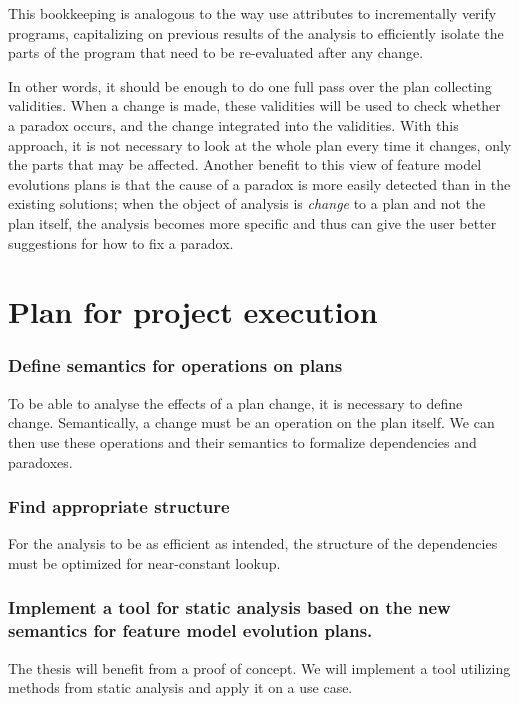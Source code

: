 \documentclass[a4paper,english]{ifimaster}
\begin{document}
This bookkeeping is analogous to the way \citeauthor{article:syntax-driven-program-verification}\parencite{article:syntax-driven-program-verification, art:inc-syntactic-semantic} use attributes to incrementally verify programs, capitalizing on previous results of the analysis to efficiently isolate the parts of the program that need to be re-evaluated after any change. 

In other words, it should be enough to do one full pass over the plan collecting validities. When a change is made, these validities will be used to check whether a paradox occurs, and the change integrated into the validities. With this approach, it is not necessary to look at the whole plan every time it changes, only the parts that may be affected. Another benefit to this view of feature model evolutions plans is that the cause of a paradox is more easily detected than in the existing solutions; when the object of analysis is \emph{change} to a plan and not the plan itself, the analysis becomes more specific and thus can give the user better suggestions for how to fix a paradox. 

\section{Plan for project execution}
\label{sec:plan-for-project-execution}

\subsubsection*{Define semantics for operations on plans}
To be able to analyse the effects of a plan change, it is necessary to define change. Semantically, a change must be an operation on the plan itself. We can then use these operations and their semantics to formalize dependencies and paradoxes.

\subsubsection*{Find appropriate structure}
For the analysis to be as efficient as intended, the structure of the dependencies must be optimized for near-constant lookup.

\subsubsection*{Implement a tool for static analysis based on the new semantics for feature model evolution plans.}
The thesis will benefit from a proof of concept. We will implement a tool utilizing methods from static analysis and apply it on a use case. 


\backmatter{}

\printbibliography{}
\end{document}
